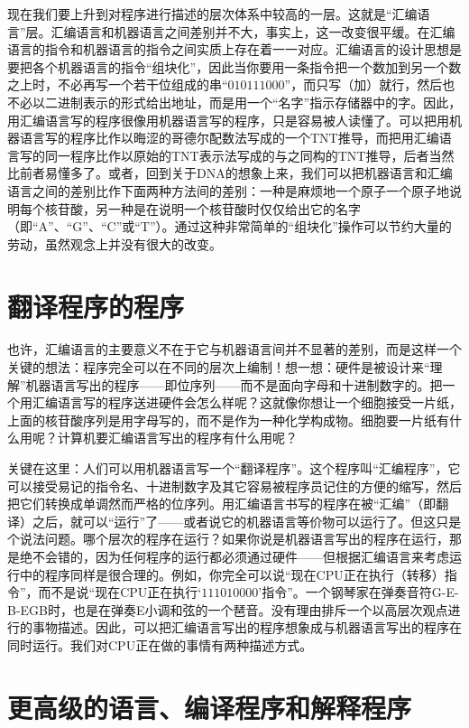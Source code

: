 现在我们要上升到对程序进行描述的层次体系中较高的一层。这就是“汇编语言”层。汇编语言和机器语言之间差别并不大，事实上，这一改变很平缓。在汇编语言的指令和机器语言的指令之间实质上存在着一一对应。汇编语言的设计思想是要把各个机器语言的指令“组块化”，因此当你要用一条指令把一个数加到另一个数之上时，不必再写一个若干位组成的串“$010111000$”，而只写（加）就行，然后也不必以二进制表示的形式给出地址，而是用一个“名字”指示存储器中的字。因此，用汇编语言写的程序很像用机器语言写的程序，只是容易被人读懂了。可以把用机器语言写的程序比作以晦涩的哥德尔配数法写成的一个TNT推导，而把用汇编语言写的同一程序比作以原始的TNT表示法写成的与之同构的TNT推导，后者当然比前者易懂多了。或者，回到关于DNA的想象上来，我们可以把机器语言和汇编语言之间的差别比作下面两种方法间的差别：一种是麻烦地一个原子一个原子地说明每个核苷酸，另一种是在说明一个核苷酸时仅仅给出它的名字（即“A”、“G”、“C”或“T”）。通过这种非常简单的“组块化”操作可以节约大量的劳动，虽然观念上并没有很大的改变。

\section{翻译程序的程序}

也许，汇编语言的主要意义不在于它与机器语言间并不显著的差别，而是这样一个关键的想法：程序完全可以在不同的层次上编制！想一想：硬件是被设计来“理解”机器语言写出的程序——即位序列——而不是面向字母和十进制数字的。把一个用汇编语言写的程序送进硬件会怎么样呢？这就像你想让一个细胞接受一片纸，上面的核苷酸序列是用字母写的，而不是作为一种化学构成物。细胞要一片纸有什么用呢？计算机要汇编语言写出的程序有什么用呢？

关键在这里：人们可以用机器语言写一个“翻译程序”。这个程序叫“汇编程序”，它可以接受易记的指令名、十进制数字及其它容易被程序员记住的方便的缩写，然后把它们转换成单调然而严格的位序列。用汇编语言书写的程序在被“汇编”（即翻译）之后，就可以“运行”了——或者说它的机器语言等价物可以运行了。但这只是个说法问题。哪个层次的程序在运行？如果你说是机器语言写出的程序在运行，那是绝不会错的，因为任何程序的运行都必须通过硬件——但根据汇编语言来考虑运行中的程序同样是很合理的。例如，你完全可以说“现在CPU正在执行（转移）指令”，而不是说“现在CPU正在执行‘$111010000$’指令”。一个钢琴家在弹奏音符G-E-B-EGB时，也是在弹奏E小调和弦的一个琶音。没有理由排斥一个以高层次观点进行的事物描述。因此，可以把汇编语言写出的程序想象成与机器语言写出的程序在同时运行。我们对CPU正在做的事情有两种描述方式。

\section{更高级的语言、编译程序和解释程序}

